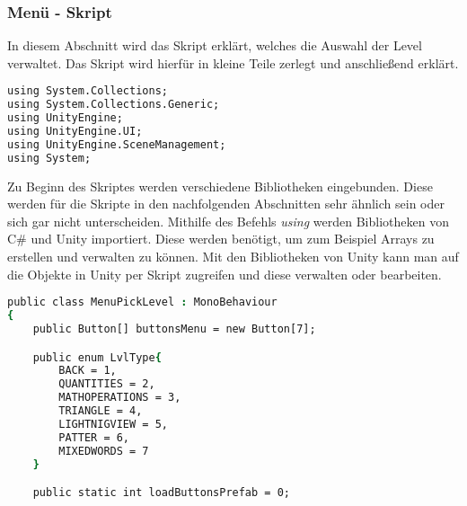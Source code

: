 \subsubsection{Menü - Skript}

In diesem Abschnitt wird das Skript erklärt, welches die Auswahl der Level verwaltet.
Das Skript wird hierfür in kleine Teile zerlegt und anschließend erklärt.\\

\begin{lstlisting}[language=csh, caption={MenuPickLevel.cs Klasse Menü Imports}]
using System.Collections;
using System.Collections.Generic;
using UnityEngine;
using UnityEngine.UI;
using UnityEngine.SceneManagement;
using System;
\end{lstlisting}

Zu Beginn des Skriptes werden verschiedene Bibliotheken eingebunden. Diese werden für die Skripte in den nachfolgenden Abschnitten sehr ähnlich sein oder sich gar nicht unterscheiden. Mithilfe des Befehls \textit{using} werden Bibliotheken von C\# und Unity importiert. Diese werden benötigt, um zum Beispiel Arrays zu erstellen und verwalten zu können. Mit den Bibliotheken von Unity kann man auf die Objekte in Unity per Skript zugreifen und diese verwalten oder bearbeiten.\\

\begin{lstlisting}[language=csh, caption={MenuPickLevel.cs Klasse Menü Variablen}]
public class MenuPickLevel : MonoBehaviour
{
	public Button[] buttonsMenu = new Button[7];

	public enum LvlType{
		BACK = 1,
		QUANTITIES = 2,
		MATHOPERATIONS = 3,
		TRIANGLE = 4,
		LIGHTNIGVIEW = 5,
		PATTER = 6,
		MIXEDWORDS = 7
	}

	public static int loadButtonsPrefab = 0;
\end{lstlisting}

